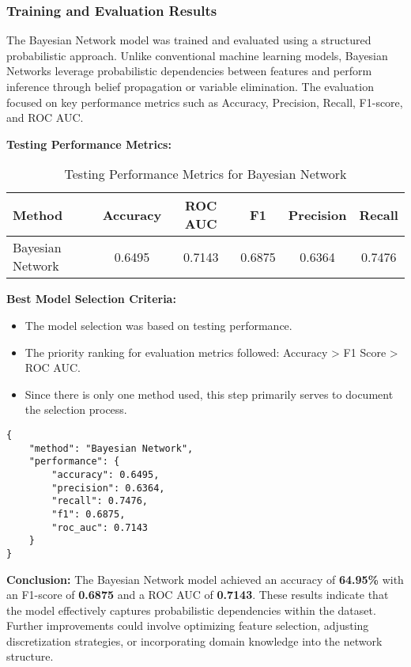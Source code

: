 \subsubsection{Training and Evaluation Results}

The Bayesian Network model was trained and evaluated using a structured probabilistic approach. Unlike conventional machine learning models, Bayesian Networks leverage probabilistic dependencies between features and perform inference through belief propagation or variable elimination. The evaluation focused on key performance metrics such as Accuracy, Precision, Recall, F1-score, and ROC AUC.

\textbf{Testing Performance Metrics:}

\begin{table}[H]
    \centering
    \caption{Testing Performance Metrics for Bayesian Network}
    \label{tab:bayesnet-testing-metrics}
    \begin{tabular}{|l|c|c|c|c|c|}
        \hline
        \textbf{Method} & \textbf{Accuracy} & \textbf{ROC AUC} & \textbf{F1} & \textbf{Precision} & \textbf{Recall} \\ 
        \hline
        Bayesian Network & 0.6495 & 0.7143 & 0.6875 & 0.6364 & 0.7476 \\ 
        \hline
    \end{tabular}
\end{table}

\textbf{Best Model Selection Criteria:}

\begin{itemize}
    \item The model selection was based on testing performance.
    \item The priority ranking for evaluation metrics followed: Accuracy > F1 Score > ROC AUC.
    \item Since there is only one method used, this step primarily serves to document the selection process.
\end{itemize}

\begin{verbatim}
{
    "method": "Bayesian Network",
    "performance": {
        "accuracy": 0.6495,
        "precision": 0.6364,
        "recall": 0.7476,
        "f1": 0.6875,
        "roc_auc": 0.7143
    }
}
\end{verbatim}

\textbf{Conclusion:}  
The Bayesian Network model achieved an accuracy of \textbf{64.95\%} with an F1-score of \textbf{0.6875} and a ROC AUC of \textbf{0.7143}. These results indicate that the model effectively captures probabilistic dependencies within the dataset. Further improvements could involve optimizing feature selection, adjusting discretization strategies, or incorporating domain knowledge into the network structure.

